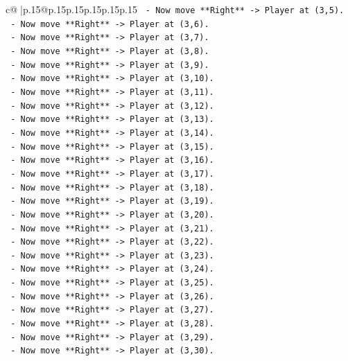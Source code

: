 \documentclass{article}
\begin{document}
{\begin{supertabular}{c@{$\;$}|p{.15\linewidth}@{}p{.15\linewidth}p{.15\linewidth}p{.15\linewidth}p{.15\linewidth}p{.15\linewidth}}
{{{\texttt{    {-}   Now move **Right** {-}> Player at (3,5).} \\
\texttt{    {-}   Now move **Right** {-}> Player at (3,6).} \\
\texttt{    {-}   Now move **Right** {-}> Player at (3,7).} \\
\texttt{    {-}   Now move **Right** {-}> Player at (3,8).} \\
\texttt{    {-}   Now move **Right** {-}> Player at (3,9).} \\
\texttt{    {-}   Now move **Right** {-}> Player at (3,10).} \\
\texttt{    {-}   Now move **Right** {-}> Player at (3,11).} \\
\texttt{    {-}   Now move **Right** {-}> Player at (3,12).} \\
\texttt{    {-}   Now move **Right** {-}> Player at (3,13).} \\
\texttt{    {-}   Now move **Right** {-}> Player at (3,14).} \\
\texttt{    {-}   Now move **Right** {-}> Player at (3,15).} \\
\texttt{    {-}   Now move **Right** {-}> Player at (3,16).} \\
\texttt{    {-}   Now move **Right** {-}> Player at (3,17).} \\
\texttt{    {-}   Now move **Right** {-}> Player at (3,18).} \\
\texttt{    {-}   Now move **Right** {-}> Player at (3,19).} \\
\texttt{    {-}   Now move **Right** {-}> Player at (3,20).} \\
\texttt{    {-}   Now move **Right** {-}> Player at (3,21).} \\
\texttt{    {-}   Now move **Right** {-}> Player at (3,22).} \\
\texttt{    {-}   Now move **Right** {-}> Player at (3,23).} \\
\texttt{    {-}   Now move **Right** {-}> Player at (3,24).} \\
\texttt{    {-}   Now move **Right** {-}> Player at (3,25).} \\
\texttt{    {-}   Now move **Right** {-}> Player at (3,26).} \\
\texttt{    {-}   Now move **Right** {-}> Player at (3,27).} \\
\texttt{    {-}   Now move **Right** {-}> Player at (3,28).} \\
\texttt{    {-}   Now move **Right** {-}> Player at (3,29).} \\
\texttt{    {-}   Now move **Right** {-}> Player at (3,30).} \\
}}}
\end{supertabular}}
\end{document}
